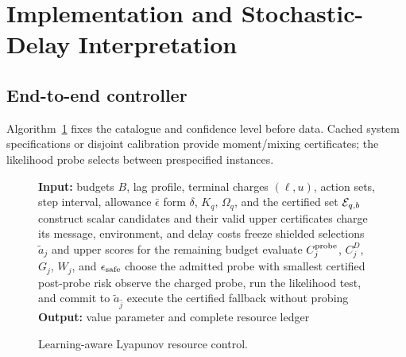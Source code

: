 \documentclass[journal]{IEEEtran}
\begin{document}
\section{Implementation and Stochastic-Delay Interpretation}
\subsection{End-to-end controller}
Algorithm~\ref{alg:controller} fixes the catalogue and confidence level before data.
Cached system specifications or disjoint calibration provide moment/mixing certificates; the likelihood probe selects between prespecified instances.

\begin{figure}[t]
\centering
\begin{minipage}{0.97\columnwidth}
\begin{algorithmic}[1]
\STATE \textbf{Input:} budgets $B$, lag profile, terminal charges $(\ell,u)$, action sets, step interval, allowance $\bar\epsilon$
\STATE form $\delta$, $K_q$, $\Omega_q$, and the certified set ${\cal E}_{q,b}$
\STATE construct scalar candidates and their valid upper certificates
\ENDFOR
{}
\STATE charge its message, environment, and delay costs
\STATE freeze shielded selections $\widetilde a_j$ and upper scores for the remaining budget
\STATE evaluate $C_j^{\rm probe}$, $C_j^D$, $G_j$, $W_j$, and $\epsilon_{\rm safe}$
\ENDFOR
{}
\STATE choose the admitted probe with smallest certified post-probe risk
\STATE observe the charged probe, run the likelihood test, and commit to $\widetilde a_{\widehat j}$
\ELSE
\STATE execute the certified fallback without probing
\ENDIF
\STATE \textbf{Output:} value parameter and complete resource ledger
\end{algorithmic}
\end{minipage}
\caption{Learning-aware Lyapunov resource control.}
\label{alg:controller}
\end{figure}
\end{document}
